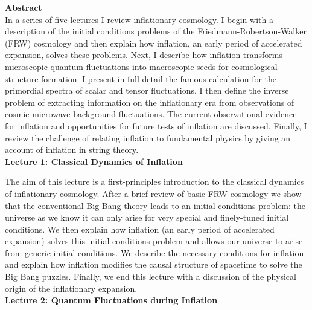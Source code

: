 \documentclass[12pt,letterpaper,rotate]{article}
\begin{document}
{\small  \noindent \textbf{Abstract} \\[0.3cm]
\noindent
In a series of five lectures I review inflationary cosmology.
I begin with a description of the initial conditions problems of the Friedmann-Robertson-Walker (FRW) cosmology and then explain how inflation, an early period of accelerated expansion, solves these problems.
Next, I describe how inflation transforms microscopic quantum fluctuations into macroscopic seeds for cosmological structure formation.
I present in full detail the famous calculation for the primordial spectra of scalar and tensor fluctuations.
I then define the inverse problem of extracting information on the inflationary era from observations of cosmic microwave background fluctuations.
The current observational evidence for inflation and opportunities for future tests of inflation are  discussed.
Finally, I review the challenge of relating inflation to fundamental physics by giving an account of inflation in string theory.\\



{\bf Lecture 1: Classical Dynamics of Inflation}

The aim of this lecture is a first-principles introduction to the classical dynamics of inflationary cosmology.
After a brief review of basic FRW cosmology we show that the conventional Big Bang theory leads to an initial conditions problem: the universe as we know it can only arise for very special and finely-tuned initial conditions. We then explain how inflation (an early period of accelerated expansion) solves this initial conditions problem and allows our universe to arise from generic initial conditions.
We describe the necessary conditions for inflation and explain how inflation modifies the causal structure of spacetime to solve the Big Bang puzzles.
Finally, we end this lecture with a discussion of the physical origin of the inflationary expansion. \\

{\bf Lecture 2: Quantum Fluctuations during Inflation}

}
\end{document}
